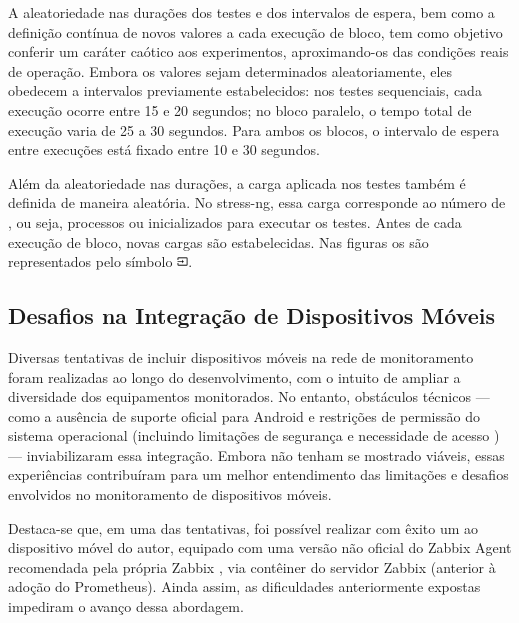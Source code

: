 A aleatoriedade nas durações dos testes e dos intervalos de espera, bem como a definição contínua de novos valores a cada execução de bloco, tem como objetivo conferir um caráter caótico aos experimentos, aproximando-os das condições reais de operação. Embora os valores sejam determinados aleatoriamente, eles obedecem a intervalos previamente estabelecidos: nos testes sequenciais, cada execução ocorre entre 15 e 20 segundos; no bloco paralelo, o tempo total de execução varia de 25 a 30 segundos. Para ambos os blocos, o intervalo de espera entre execuções está fixado entre 10 e 30 segundos.

Além da aleatoriedade nas durações, a carga aplicada nos testes também é definida de maneira aleatória. No stress-ng, essa carga corresponde ao número de , ou seja, processos ou  inicializados para executar os testes. Antes de cada execução de bloco, novas cargas são estabelecidas. Nas figuras os  são representados pelo símbolo \includegraphics[height=0.8em]{Imagens/chap03/input_black.png}. 

\subsection{Desafios na Integração de Dispositivos Móveis}
\label{subsection:DesafiosDispositivosMoveis}

Diversas tentativas de incluir dispositivos móveis na rede de monitoramento foram realizadas ao longo do desenvolvimento, com o intuito de ampliar a diversidade dos equipamentos monitorados. No entanto, obstáculos técnicos --- como a ausência de suporte oficial para Android e restrições de permissão do sistema operacional (incluindo limitações de segurança e necessidade de acesso ) --- inviabilizaram essa integração. Embora não tenham se mostrado viáveis, essas experiências contribuíram para um melhor entendimento das limitações e desafios envolvidos no monitoramento de dispositivos móveis.

Destaca-se que, em uma das tentativas, foi possível realizar com êxito um  ao dispositivo móvel do autor, equipado com uma versão não oficial do Zabbix Agent recomendada pela própria Zabbix \citep{unofficialzabbixagent2025}, via contêiner do servidor Zabbix (anterior à adoção do Prometheus). Ainda assim, as dificuldades anteriormente expostas impediram o avanço dessa abordagem.

